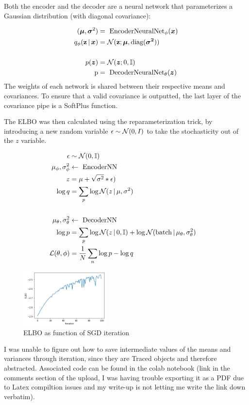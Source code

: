 \documentclass[11pt]{article}
\begin{document}
\begin{enumerate}[label=(\alph*)]
\begin{solution}
    Both the encoder and the decoder are a neural network that parameterizes a Gaussian distribution (with diagonal covariance):

    \begin{align*}
        (\boldsymbol{\mu}, \boldsymbol{\sigma}^2) &=\textrm{ EncoderNeuralNet}_{\phi}(\boldsymbol{x}) \\
        q_{\phi}(\mathbf{z} \,|\, \boldsymbol{x}) &=\mathcal{N}(\mathbf{z} ; \boldsymbol{\mu}, \textrm{diag}(\boldsymbol{\sigma^2})) \\
        & \\
        p(\boldsymbol{z}) &= \mathcal{N}(\boldsymbol{z}; 0, \mathbb{I}) \\
        \textrm{p} &= \textrm{ DecoderNeuralNet}_{\theta}(\boldsymbol{z})
    \end{align*}
The weights of each network is shared between their respective means and covariances. To ensure that a valid covariance is outputted, the last layer of the covariance pipe is a SoftPlus function.

The ELBO was then calculated using the reparameterization trick, by introducing a new random variable $\epsilon\sim\mathcal{N}(0,I)$ to take the stochasticity out of the $z$ variable.

\begin{align*}
    \epsilon &\sim \mathcal{N}(0,\mathbb{I}) \\
    \mu_\phi, \sigma_\phi^2 &\leftarrow \textrm{ EncoderNN } \\
    z &= \mu + \sqrt{\sigma^2}*\epsilon) \\
    \log q &= \sum_p \log \mathcal{N}(z \,|\, \mu, \sigma^2) \\
    & \\
    \mu_\theta, \sigma_\theta^2 &\leftarrow \textrm{ DecoderNN } \\
    \log p &= \sum_p \log \mathcal{N}(z \,|\, 0, \mathbb{I}) + \log \mathcal{N}(\textrm{batch} \,|\, \mu_\theta, \sigma_\theta^2)
    & \\
    \mathcal{L}(\theta, \phi) &= \frac{1}{N}\sum_n \log p - \log q
\end{align*}
\begin{figure}
    \centering
    \includegraphics[width=0.4\textwidth]{2c_2_elbo.png}
    \caption{ELBO as function of SGD iteration}
\end{figure}

I was unable to figure out how to save intermediate values of the means and variances through iteration, since they are Traced objects and therefore abstracted. Associated code can be found in the colab notebook (link in the comments section of the upload, I was having trouble exporting it as a PDF due to Latex compiltion issues and my write-up is not letting me write the link down verbatim).

\end{solution}
\end{enumerate}
\end{document}
